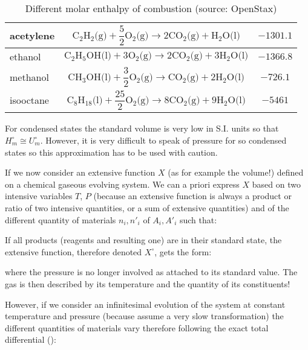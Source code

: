 \begin{enumerate}
\begin{table}[H]
\begin{tabular}{|l|c|c|}
			acetylene & $\mathrm{C}_2\mathrm{H}_2\text{(g)}+\dfrac{5}{2}\mathrm{O}_2\text{(g)}\rightarrow 2\mathrm{CO}_2\text{(g)}+\mathrm{H}_2\mathrm{O}\text{(l)}$ & $-1301.1$ \\ \hline
			ethanol & $\mathrm{C}_2\mathrm{H}_5\mathrm{OH}\text{(l)}+3\mathrm{O}_2\text{(g)}\rightarrow 2\mathrm{CO}_2\text{(g)}+3\mathrm{H}_2\mathrm{O}\text{(l)}$ & $-1366.8$ \\ \hline
			methanol & $\mathrm{CH}_3\mathrm{OH}\text{(l)}+\dfrac{3}{2}\mathrm{O}_2\text{(g)}\rightarrow \mathrm{CO}_2\text{(g)}+2\mathrm{H}_2\mathrm{O}\text{(l)}$ & $-726.1$ \\ \hline
			isooctane & $\mathrm{C}_8\mathrm{H}_{18}\text{(l)}+\dfrac{25}{2}\mathrm{O}_2\text{(g)}\rightarrow 8\mathrm{CO}_2\text{(g)}+9\mathrm{H}_2\mathrm{O}\text{(l)}$ & $-5461$ \\ \hline
			\end{tabular}
			\caption[Different molar enthalpy of combustion]{Different molar enthalpy of combustion (source: OpenStax)}
		\end{table}
	\end{enumerate}
	\begin{tcolorbox}[title=Remark,colframe=black,arc=10pt]
	For condensed states the standard volume is very low in S.I. units so that $H_m^\circ\cong U_m^\circ$. However, it is very difficult to speak of pressure for so condensed states so this approximation has to be used with caution.
	\end{tcolorbox}	
	If we now consider an extensive function $X$ (as for example the volume!) defined on a chemical gaseous evolving system. We can a priori express $X$ based on two intensive variables $T$, $P$ (because an extensive function is always a product or ratio of two intensive quantities, or a sum of extensive quantities) and of the different quantity of materials $n_i,{n'}_i$ of $A_i,{A'}_i$ such that:
	
	If all products (reagents and resulting one) are in their standard state, the extensive function, therefore denoted $X^\circ$, gets the form:
	
	where the pressure is no longer involved as attached to its standard value. The gas is then described by its temperature and the quantity of its constituents!
	
	However, if we consider an infinitesimal evolution of the system at constant temperature and pressure (because assume a very slow transformation) the different quantities of materials vary therefore following the exact total differential ():
	
